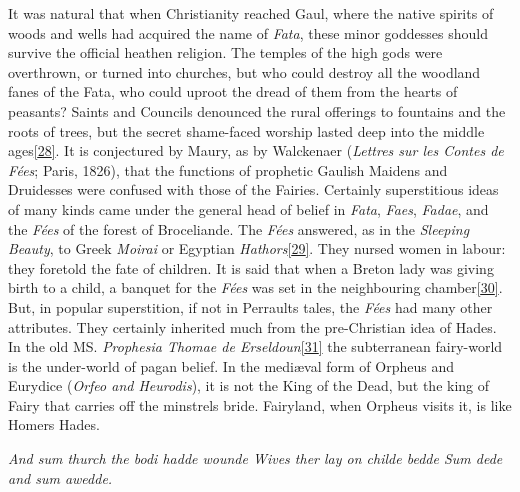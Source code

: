 \documentclass[14pt,a4paper]{memoir}
\begin{document}
It was natural that when Christianity reached Gaul, where the native
spirits of woods and wells had acquired the name of \emph{Fata}, these
minor goddesses should survive the official heathen religion. The
temples of the high gods were overthrown, or turned into churches, but
who could destroy all the woodland fanes of the Fata, who could uproot
the dread of them from the hearts of peasants? Saints and Councils
denounced the rural offerings to fountains and the roots of trees, but
the secret shame-faced worship lasted deep into the middle
ages\protect\hypertarget{4533318093929944247_33931-h-0.htm.xhtmlux5cux23FNanchor_28}{}{}\protect\hyperlink{4533318093929944247_33931-h-0.htm.xhtmlux5cux23Footnote_28}{{[}28{]}}.
It is conjectured by Maury, as by Walckenaer (\emph{Lettres sur les
Contes de Fées}; Paris, 1826), that the functions of prophetic Gaulish
Maidens and Druidesses were confused with those of the Fairies.
Certainly superstitious ideas of many kinds came under the general head
of belief in \emph{Fata}, \emph{Faes}, \emph{Fadae}, and the \emph{Fées}
of the forest of Broceliande. The \emph{Fées} answered, as in the
\emph{Sleeping Beauty}, to Greek \emph{Moirai} or Egyptian
\emph{Hathors}\protect\hypertarget{4533318093929944247_33931-h-0.htm.xhtmlux5cux23FNanchor_29}{}{}\protect\hyperlink{4533318093929944247_33931-h-0.htm.xhtmlux5cux23Footnote_29}{{[}29{]}}.
They nursed women in labour: they foretold the fate of children. It is
said that when a Breton lady was giving birth to a child, a banquet for
the \emph{Fées} was set in the neighbouring
chamber\protect\hypertarget{4533318093929944247_33931-h-0.htm.xhtmlux5cux23FNanchor_30}{}{}\protect\hyperlink{4533318093929944247_33931-h-0.htm.xhtmlux5cux23Footnote_30}{{{[}30{]}}}.
But, in popular superstition, if not in Perrault\textquotesingle s
tales, the \emph{Fées} had many other attributes. They certainly
inherited much from the pre-Christian idea of Hades. In the old MS.
\emph{Prophesia Thomae de
Erseldoun}\protect\hypertarget{4533318093929944247_33931-h-0.htm.xhtmlux5cux23FNanchor_31}{}{}\protect\hyperlink{4533318093929944247_33931-h-0.htm.xhtmlux5cux23Footnote_31}{{[}31{]}}
the subterranean fairy-world is the under-world of pagan belief. In the
mediæval form of Orpheus and Eurydice (\emph{Orfeo and Heurodis}), it is
not the King of the Dead, but the king of Fairy that carries off the
minstrel\textquotesingle s bride. Fairyland, when Orpheus visits it, is
like Homer\textquotesingle s Hades.

\emph{{\textquotesingle And sum thurch the bodi hadde wounde} {Wives
ther lay on childe bedde} {Sum dede and sum awedde.\textquotesingle{}}}
\end{document}
